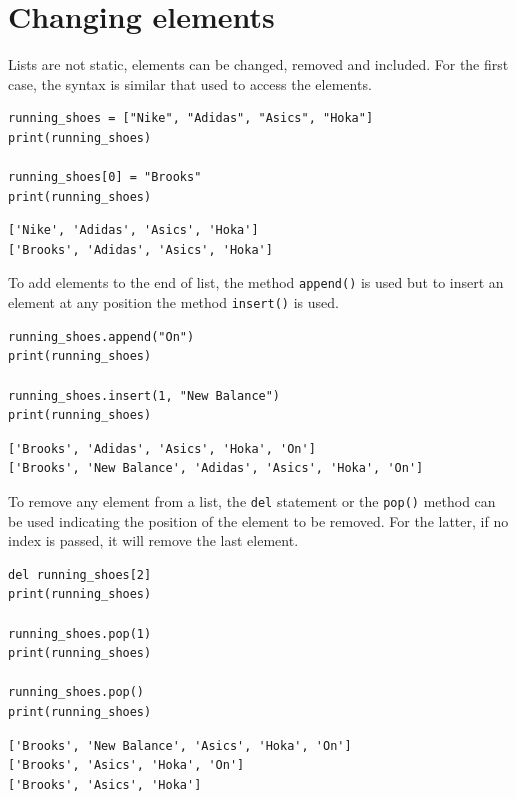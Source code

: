 \documentclass[10pt]{book}
\begin{document}
\section{Changing elements}
\label{sec:org8d2da7b}
Lists are not static, elements can be changed, removed and included. For the first case, the syntax is similar that used to access the elements.

\label{org6794073}
\begin{verbatim}
running_shoes = ["Nike", "Adidas", "Asics", "Hoka"]
print(running_shoes)

running_shoes[0] = "Brooks"
print(running_shoes)
\end{verbatim}

\label{orgcb8c5c0}
\begin{verbatim}
['Nike', 'Adidas', 'Asics', 'Hoka']
['Brooks', 'Adidas', 'Asics', 'Hoka']
\end{verbatim}

To add elements to the end of list, the method \texttt{append()} is used but to insert an element at any position the method \texttt{insert()} is used.

\label{orge12d4d9}
\begin{verbatim}
running_shoes.append("On")
print(running_shoes)

running_shoes.insert(1, "New Balance")
print(running_shoes)
\end{verbatim}

\label{orga8b0050}
\begin{verbatim}
['Brooks', 'Adidas', 'Asics', 'Hoka', 'On']
['Brooks', 'New Balance', 'Adidas', 'Asics', 'Hoka', 'On']
\end{verbatim}

To remove any element from a list, the \texttt{del} statement or the \texttt{pop()} method can be used indicating the position of the element to be removed. For the latter, if no index is passed, it will remove the last element.

\label{org641fc02}
\begin{verbatim}
del running_shoes[2]
print(running_shoes)

running_shoes.pop(1)
print(running_shoes)

running_shoes.pop()
print(running_shoes)
\end{verbatim}

\label{org6eb8c99}
\begin{verbatim}
['Brooks', 'New Balance', 'Asics', 'Hoka', 'On']
['Brooks', 'Asics', 'Hoka', 'On']
['Brooks', 'Asics', 'Hoka']
\end{verbatim}
\end{document}
